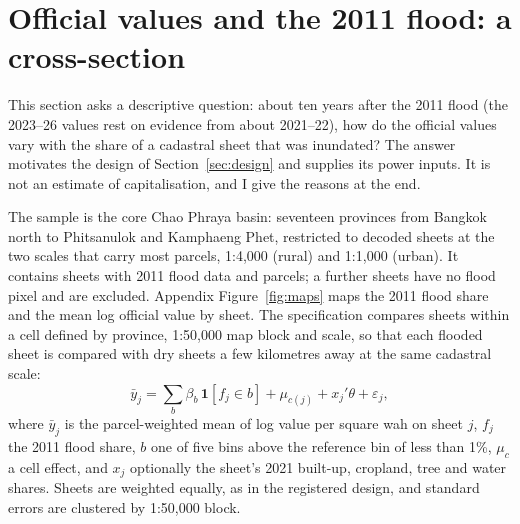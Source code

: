 \section{Official values and the 2011 flood: a cross-section}\label{sec:cross}

This section asks a descriptive question: about ten years after the 2011 flood (the 2023--26 values rest on evidence from about 2021--22), how do the official values vary with the share of a cadastral sheet that was inundated? The answer motivates the design of Section~\ref{sec:design} and supplies its power inputs. It is not an estimate of capitalisation, and I give the reasons at the end.

The sample is the core Chao Phraya basin: seventeen provinces from Bangkok north to Phitsanulok and Kamphaeng Phet, restricted to decoded sheets at the two scales that carry most parcels, 1:4,000 (rural) and 1:1,000 (urban). It contains \pilotSheets{} sheets with 2011 flood data and \pilotParcels{} parcels; a further \pilotSheetsNoFlood{} sheets have no flood pixel and are excluded. Appendix Figure~\ref{fig:maps} maps the 2011 flood share and the mean log official value by sheet. The specification compares sheets within a cell defined by province, 1:50,000 map block and scale, so that each flooded sheet is compared with dry sheets a few kilometres away at the same cadastral scale:
\begin{equation}
\bar y_{j} = \sum_{b} \beta_b \,\mathbf{1}[f_j \in b] + \mu_{c(j)} + x_j'\theta + \varepsilon_j,
\label{eq:cross}
\end{equation}
where $\bar y_j$ is the parcel-weighted mean of log value per square wah on sheet $j$, $f_j$ the 2011 flood share, $b$ one of five bins above the reference bin of less than 1\%, $\mu_c$ a cell effect, and $x_j$ optionally the sheet's 2021 built-up, cropland, tree and water shares. Sheets are weighted equally, as in the registered design, and standard errors are clustered by 1:50,000 block.

\begin{table}[t]
\centering\footnotesize
\caption{Official land value by 2011 flood-share bin}\label{tab:binned}

\end{table}

